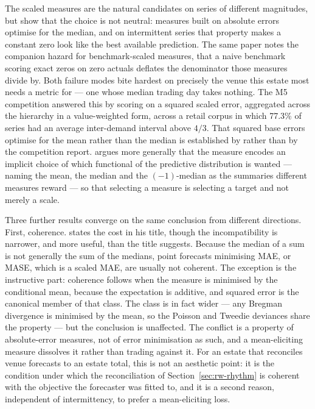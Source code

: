 The scaled measures are the natural candidates on series of different
magnitudes, but \citet{hewamalage_forecast_2023} show that the choice is not
neutral: measures built on absolute errors optimise for the median, and on
intermittent series that property makes a constant zero look like the best
available prediction. The same paper notes the companion hazard for
benchmark-scaled measures, that a naive benchmark scoring exact zeros on zero
actuals deflates the denominator those measures divide by. Both failure modes
bite hardest on precisely the venue this estate most needs a metric for --- one
whose median trading day takes nothing. The M5 competition
\citep{makridakis_m5_2022} answered this by scoring on a squared scaled error,
aggregated across the hierarchy in a value-weighted form, across a retail
corpus in which 77.3\% of series had an average inter-demand interval above
$4/3$. That squared base errors optimise for the mean rather than the median is
established by \citet{hewamalage_forecast_2023} rather than by the competition
report. \citet{kolassa_why_2020} argues more generally that the measure encodes
an implicit choice of which functional of the predictive distribution is wanted
--- naming the mean, the median and the $(-1)$-median as the summaries
different measures reward --- so that selecting a measure is selecting a target
and not merely a scale.

Three further results converge on the same conclusion from different
directions. First, coherence. \citet{kolassa_we_2023} states the cost in his
title, though the incompatibility is narrower, and more useful, than the title
suggests. Because the median of a sum is not generally the sum of the medians,
point forecasts minimising MAE, or MASE, which is a scaled MAE, are usually not
coherent. The exception is the instructive part: coherence follows when the
measure is minimised by the conditional mean, because the expectation is
additive, and squared error is the canonical member of that class. The class is
in fact wider --- any Bregman divergence is minimised by the mean, so the
Poisson and Tweedie deviances share the property --- but the conclusion is
unaffected. The conflict is a property of absolute-error measures, not of error
minimisation as such, and a mean-eliciting measure dissolves it rather than
trading against it. For an estate that reconciles venue forecasts to an estate
total, this is not an aesthetic point: it is the condition under which the
reconciliation of Section~\ref{sec:rw-rhythm} is coherent with the objective
the forecaster was fitted to, and it is a second reason, independent of
intermittency, to prefer a mean-eliciting loss.

